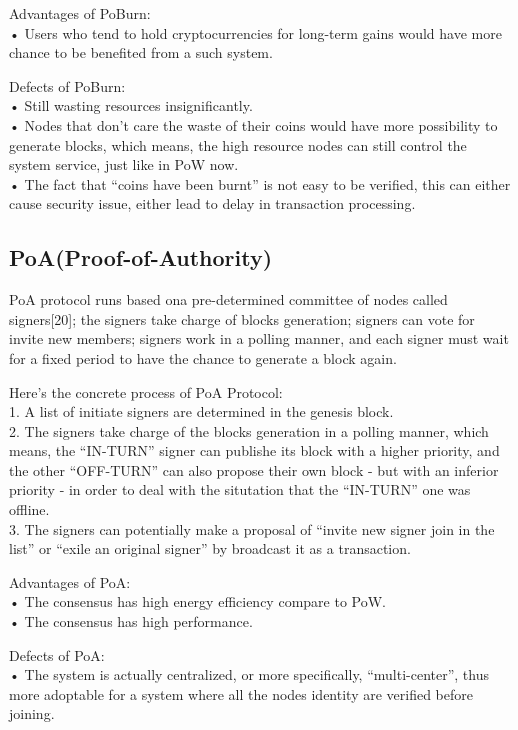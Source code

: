 \documentclass[doublespacing]{bmcart}
\begin{document}
\begin{CJK*}{UTF8}{gbsn}
Advantages of PoBurn:
\\• Users who tend to hold cryptocurrencies for long-term gains would have more chance to be benefited from a such system.
	 
Defects of PoBurn:
\\• Still wasting resources insignificantly.
\\• Nodes that don't care the waste of their coins would have more possibility to generate blocks, which means, the high resource nodes can still control the system service, just like in PoW now.
\\• The fact that ``coins have been burnt'' is not easy to be verified, this can either cause security issue, either lead to delay in transaction processing.
	
	\subsection{PoA(Proof-of-Authority)}
	 
	PoA protocol runs based ona  pre-determined committee of nodes called signers[20]; the signers take charge of blocks generation; signers can vote for invite new members; signers work in a polling manner, and each signer must wait for a fixed period to have the chance to generate a block again.
	 	
	Here's the concrete process of PoA Protocol: 
	\\1. A list of initiate signers are determined in the genesis block.
	\\2. The signers take charge of the blocks generation in a polling manner, which means, the ``IN-TURN'' signer can publishe its block with a higher priority, and the other ``OFF-TURN'' can also propose their own block - but with an inferior priority - in order to deal with the situtation that the ``IN-TURN'' one was offline.
	\\3. The signers can potentially make a proposal of ``invite new signer join in the list'' or ``exile an original signer'' by broadcast it as a transaction.
	 
Advantages of PoA:
\\• The consensus has high energy efficiency compare to PoW.
\\• The consensus has high performance.
	 
Defects of PoA:
\\• The system is actually centralized, or more specifically, ``multi-center'', thus more adoptable for a system where all the nodes identity are verified before joining.
	

\end{CJK*}
\end{document}
